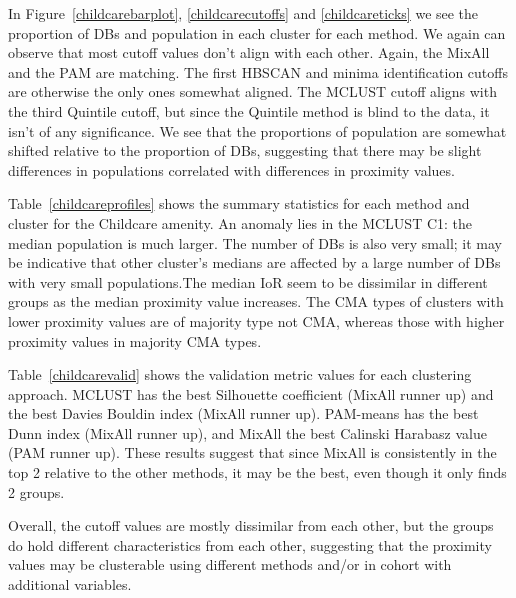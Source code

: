 \documentclass[11pt, a4paper]{article}
\begin{document}
In Figure~\ref{childcarebarplot}, \ref{childcarecutoffs} and \ref{childcareticks} we see the proportion of DBs and population in each cluster for each method. We again can observe that most cutoff values don't align with each other. Again, the MixAll and the PAM are matching. The first HBSCAN and minima identification cutoffs are otherwise the only ones somewhat aligned. The MCLUST cutoff aligns with the third Quintile cutoff, but since the Quintile method is blind to the data, it isn't of any significance. We see that the proportions of population are somewhat shifted relative to the proportion of DBs, suggesting that there may be slight differences in populations correlated with differences in proximity values.
\par
Table~\ref{childcareprofiles} shows the summary statistics for each method and cluster for the Childcare amenity. An anomaly lies in the MCLUST C1: the median population is much larger. The number of DBs is also very small; it may be indicative that other cluster's medians are affected by a large number of DBs with very small populations.The median IoR seem to be dissimilar in different groups as the median proximity value increases. The CMA types of clusters with lower proximity values are of majority type not CMA, whereas those with higher proximity values in majority CMA types.
\par
Table~\ref{childcarevalid} shows the validation metric values for each clustering approach. MCLUST has the best Silhouette coefficient (MixAll runner up) and the best Davies Bouldin index (MixAll runner up). PAM-means has the best Dunn index (MixAll runner up), and MixAll the best Calinski Harabasz value (PAM runner up). These results suggest that since MixAll is consistently in the top 2 relative to the other methods, it may be the best, even though it only finds 2 groups.
\par
Overall, the cutoff values are mostly dissimilar from each other, but the groups do hold different characteristics from each other, suggesting that the proximity values may be clusterable using different methods and/or in cohort with additional variables.
\end{document}
